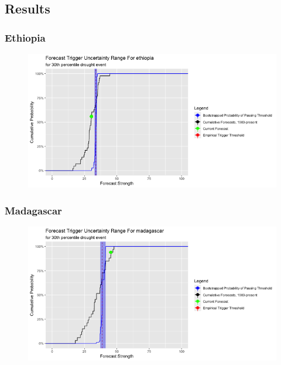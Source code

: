 \documentclass{ametsocV5}
\begin{document}
\subsection{Results}






\subsubsection{Ethiopia}

\begin{figure}
    \centering
    \includegraphics[width=0.9\linewidth]{figures/ethiopia.png}
\end{figure}

\subsubsection{Madagascar}

\begin{figure}
    \centering
    \includegraphics[width=0.9\linewidth]{figures/madagascar.png}
\end{figure}
\end{document}
